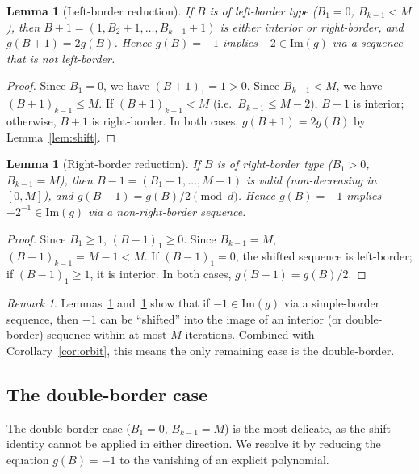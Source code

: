 \documentclass[12pt, a4paper]{amsart}
\theoremstyle{plain}
\newtheorem{lemma}[theorem]{Lemma}
\theoremstyle{definition}
\theoremstyle{remark}
\newtheorem{remark}[theorem]{Remark}
\begin{document}
\begin{lemma}[Left-border reduction]\label{lem:left-border}
  If $B$ is of left-border type ($B_1 = 0$, $B_{k-1} < M$),
  then $B + 1 = (1, B_2 + 1, \ldots, B_{k-1} + 1)$ is either
  interior or right-border, and $g(B + 1) = 2g(B)$.
  Hence $g(B) = -1$ implies $-2 \in \mathrm{Im}(g)$
  via a sequence that is not left-border.
\end{lemma}

\begin{proof}
  Since $B_1 = 0$, we have $(B+1)_1 = 1 > 0$.
  Since $B_{k-1} < M$, we have $(B+1)_{k-1} \leq M$.
  If $(B+1)_{k-1} < M$ (i.e.\ $B_{k-1} \leq M - 2$),
  $B + 1$ is interior; otherwise, $B + 1$ is right-border.
  In both cases, $g(B + 1) = 2g(B)$ by Lemma~\ref{lem:shift}.
\end{proof}

\begin{lemma}[Right-border reduction]\label{lem:right-border}
  If $B$ is of right-border type ($B_1 > 0$, $B_{k-1} = M$),
  then $B - 1 = (B_1 - 1, \ldots, M - 1)$ is valid
  (non-decreasing in $[0, M]$), and
  $g(B - 1) = g(B)/2 \pmod{d}$.
  Hence $g(B) = -1$ implies $-2^{-1} \in \mathrm{Im}(g)$
  via a non-right-border sequence.
\end{lemma}

\begin{proof}
  Since $B_1 \geq 1$, $(B - 1)_1 \geq 0$.
  Since $B_{k-1} = M$, $(B-1)_{k-1} = M - 1 < M$.
  If $(B-1)_1 = 0$, the shifted sequence is left-border;
  if $(B-1)_1 \geq 1$, it is interior.
  In both cases, $g(B-1) = g(B)/2$.
\end{proof}

\begin{remark}\label{rem:border-strategy}
  Lemmas~\ref{lem:left-border} and~\ref{lem:right-border}
  show that if $-1 \in \mathrm{Im}(g)$ via a simple-border
  sequence, then $-1$ can be ``shifted'' into the image
  of an interior (or double-border) sequence within at most
  $M$ iterations.
  Combined with Corollary~\ref{cor:orbit}, this means the
  only remaining case is the double-border.
\end{remark}

\subsection{The double-border case}\label{ssec:double-border}

The double-border case ($B_1 = 0$, $B_{k-1} = M$) is
the most delicate, as the shift identity cannot be applied
in either direction.
We resolve it by reducing the equation $g(B) = -1$ to the
vanishing of an explicit polynomial.
\end{document}
